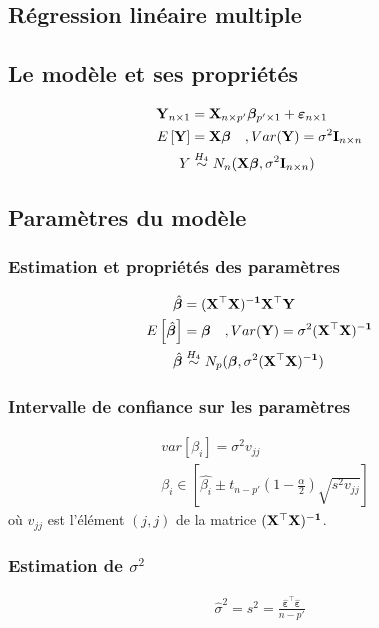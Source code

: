 \documentclass[10pt, french]{article}
\begin{document}
\begin{multicols*}{3}
\section{Régression linéaire multiple}
\subsection*{Le modèle et ses propriétés}
\begin{align*}
\mathbf{Y}_{n \times 1} & = \mathbf{X}_{n \times p'} \bm{\beta}_{p' \times 1} + \bm{\varepsilon}_{n \times 1} \\
E \left[ \mathbf{Y} \right]	& = \mathbf{X} \bm{\beta} \quad , Var(\mathbf{Y}) = \sigma^2 \mathbf{I}_{n \times n} \\
Y & \overset{H_4}{\sim} N_n(\mathbf{X} \bm{\beta}, \sigma^2 \mathbf{I}_{n \times n}) \\
\end{align*}

\subsection*{Paramètres du modèle}
\subsubsection*{Estimation et propriétés des paramètres}
\begin{align*}
\hat{\bm{\beta}} & = \mathbf{(X^\top X)^{-1} X^\top Y} \\
E \left[ \hat{\bm{\beta}} \right]	& = \bm{\beta} \quad , Var(\mathbf{Y}) = \sigma^2 (\mathbf{X^\top X)^{-1}} \\
\hat{\bm{\beta}} & \overset{H_4}{\sim} N_p(\bm{\beta}, \sigma^2 (\mathbf{X^\top X)^{-1}})
\end{align*}

\subsubsection*{Intervalle de confiance sur les paramètres}
\begin{align*}
&var[\beta_i] = \sigma^2 v_{jj} \\
&\beta_i \in \left[ \hat{\beta_i} \pm t_{n-p'}(1- \frac{\alpha}{2}) \sqrt{s^2 v_{jj}} \right]
\end{align*}
où $v_{jj}$ est l'élément $(j,j)$ de la matrice $\mathbf{(X^\top X)^{-1}}$.
\subsubsection*{Estimation de $\sigma^2$}
\begin{align*}
\hat{\sigma}^2 = s^2 = \frac{\hat{\bm{\varepsilon}}^\top \hat{\bm{\varepsilon}}}{n-p'}
\end{align*}


\end{multicols*}
\end{document}
